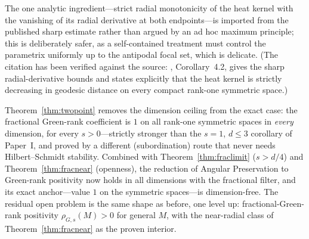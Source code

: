 \begin{remark}
The one analytic ingredient---strict radial monotonicity of the heat kernel with the vanishing
of its radial derivative at both endpoints---is imported from the published sharp estimate
\cite{nss} rather than argued by an ad hoc maximum principle; this is deliberately safer, as a
self-contained treatment must control the parametrix uniformly up to the antipodal focal set,
which is delicate. (The citation has been verified against the source: \cite{nss},
Corollary~4.2, gives the sharp radial-derivative bounds and states explicitly that the heat
kernel is strictly decreasing in geodesic distance on every compact rank-one symmetric space.)
\end{remark}

\begin{remark}
Theorem~\ref{thm:twopoint} removes the dimension ceiling from the exact case: the fractional
Green-rank coefficient is $1$ on all rank-one symmetric spaces in \emph{every} dimension, for
every $s>0$---strictly stronger than the $s=1$, $d\le3$ corollary of Paper~I, and proved by a
different (subordination) route that never needs Hilbert--Schmidt stability. Combined with
Theorem~\ref{thm:fraclimit} ($s>d/4$) and Theorem~\ref{thm:fracnear} (openness), the reduction
of Angular Preservation to Green-rank positivity now holds in all dimensions with the
fractional filter, and its exact anchor---value $1$ on the symmetric spaces---is dimension-free.
The residual open problem is the same shape as before, one level up: fractional-Green-rank
positivity $\rho_{G,s}(M)>0$ for general $M$, with the near-radial class of
Theorem~\ref{thm:fracnear} as the proven interior.
\end{remark}

